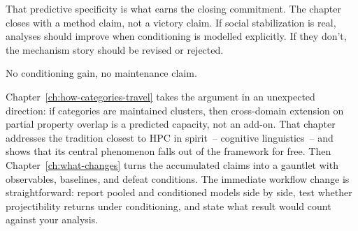 That predictive specificity is what earns the closing commitment. The chapter closes with a method claim, not a victory claim. If social stabilization is real, analyses should improve when conditioning is modelled explicitly. If they don't, the mechanism story should be revised or rejected.

No conditioning gain, no maintenance claim.

Chapter~\ref{ch:how-categories-travel} takes the argument in an unexpected direction: if categories are maintained clusters, then cross-domain extension on partial property overlap is a predicted capacity, not an add-on. That chapter addresses the tradition closest to HPC in spirit~-- cognitive linguistics~-- and shows that its central phenomenon falls out of the framework for free. Then Chapter~\ref{ch:what-changes} turns the accumulated claims into a gauntlet with observables, baselines, and defeat conditions. The immediate workflow change is straightforward: report pooled and conditioned models side by side, test whether projectibility returns under conditioning, and state what result would count against your analysis.
